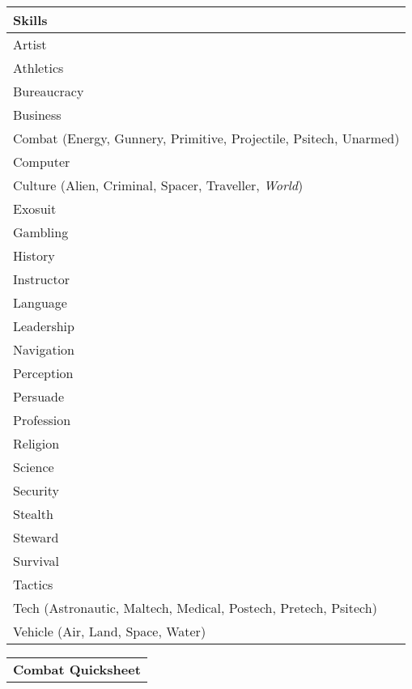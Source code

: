 \documentclass[10pt,letterpaper]{article}
\begin{document}
\begin{multicols}{3}
\begin{tabularx}{\columnwidth}{ | X | X | }
        \hline
    \end{tabularx}
    \begin{tabularx}{\columnwidth}{ | X |}
        \hline
        \textbf{Skills} \\
        \hline
        Artist \\
        \hline
        Athletics \\
        \hline
        Bureaucracy \\
        \hline
        Business \\
        \hline
        Combat (Energy, Gunnery, Primitive, Projectile, Psitech, Unarmed) \\
        \hline
        Computer \\
        \hline
        Culture (Alien, Criminal, Spacer, Traveller, \textit{World}) \\
        \hline
        Exosuit \\
        \hline
        Gambling \\
        \hline
        History \\
        \hline
        Instructor \\
        \hline
        Language \\
        \hline
        Leadership \\
        \hline
        Navigation \\
        \hline
        Perception \\
        \hline
        Persuade \\
        \hline
        Profession \\
        \hline
        Religion \\
        \hline
        Science \\
        \hline
        Security \\
        \hline
        Stealth \\
        \hline
        Steward \\
        \hline
        Survival \\ 
        \hline
        Tactics \\
        \hline
        Tech (Astronautic, Maltech, Medical, Postech, Pretech, Psitech) \\
        \hline
        Vehicle (Air, Land, Space, Water) \\
        \hline
    \end{tabularx}
    \begin{tabularx}{\columnwidth}{ | X | X | }
        \hline
        \multicolumn{2}{|c|}{\textbf{Combat Quicksheet}} \\

\end{tabularx}
\end{multicols}
\end{document}

